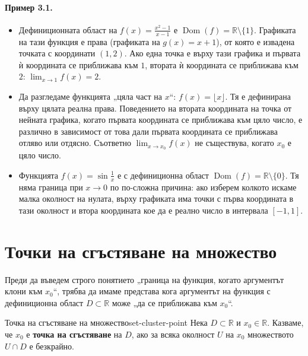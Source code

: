 \paragraph{Пример 3.1.}
\begin{itemize}
    \item Дефиниционната област на $f(x) = \frac{x^2 - 1}{x - 1}$ е $\operatorname{Dom}(f) = \mathbb{R} \setminus \{1\}$. Графиката на тази функция е права (графиката на $g(x) = x + 1$), от която е извадена точката с координати $(1, 2)$. Ако една точка е върху тази графика и първата ѝ координата се приближава към $1$, втората ѝ координата се приближава към $2$: $\lim_{x\to 1} f(x) = 2$.
    \item Да разгледаме функцията „цяла част на $x$“: $f(x) = \lfloor x \rfloor$. Тя е дефинирана върху цялата реална права. Поведението на втората координата на точка от нейната графика, когато първата координата се приближава към цяло число, е различно в зависимост от това дали първата координата се приближава отляво или отдясно. Съответно $\lim_{x\to x_0} f(x)$ не съществува, когато $x_0$ е цяло число.
    \item Функцията $f(x) = \sin \frac{1}{x}$ е с дефиниционна област $\operatorname{Dom}(f) = \mathbb{R} \setminus \{0\}$. Тя няма граница при $x \to 0$ по по-сложна причина: ако изберем колкото искаме малка околност на нулата, върху графиката има точки с първа координата в тази околност и втора координата кое да е реално число в интервала $[-1, 1]$.
\end{itemize}

\section{Точки на сгъстяване на множество}
Преди да въведем строго понятието „граница на функция, когато аргументът клони към $x_0$“, трябва да имаме представа кога аргументът на функция с дефиниционна област $D \subset \mathbb{R}$ може „да се приближава към $x_0$“.

\begin{definition}{Точка на сгъстяване на множество}{set-cluster-point}
Нека $D \subset \mathbb{R}$ и $x_0 \in \mathbb{R}$. Казваме, че $x_0$ е \textbf{точка на сгъстяване} на $D$, ако за всяка околност $U$ на $x_0$ множеството $U \cap D$ е безкрайно.
\end{definition}

